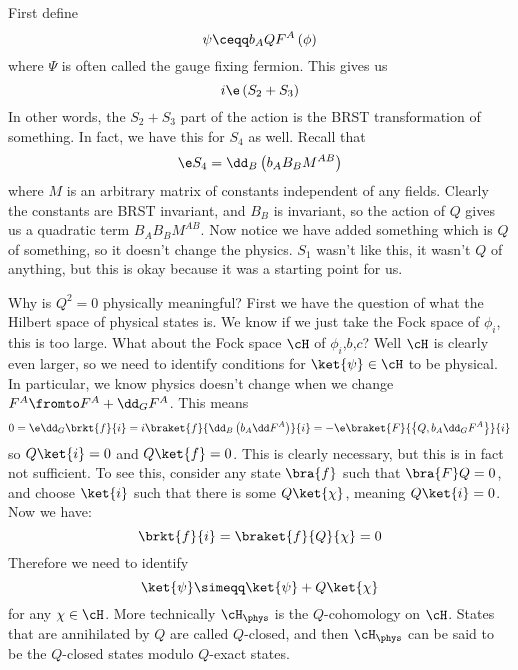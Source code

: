 \documentclass{booc}
\begin{document}
First define
\begin{equation}
\psi \ceqq b_AQ F^A\left( \phi \right)
\end{equation}
where $\Psi$ is often called the gauge fixing fermion. 
This gives us
\begin{equation}
i\e \left( S_2 + S_3 \right)
\end{equation}
In other words, the $S_2 + S_3$ part of the action is the BRST transformation of something.
In fact, we have this for $S_4$ as well. Recall that
\begin{equation}
\e S_4 = \dd_B\left( b_A B_B M^{AB} \right)
\end{equation}
where $M$ is an arbitrary matrix of constants independent of any fields. 
Clearly the constants are BRST invariant, and $B_B$ is invariant, so
the action of $Q$ gives us a quadratic term $B_A B_B M^{AB}$.
Now notice we have added something which is $Q$ of something, so it doesn't
change the physics. 
$S_1$ wasn't like this, it wasn't $Q$ of anything, but this is okay
because it was a starting point for us. 

Why is $Q^2 = 0$ physically meaningful?
First we have the question of what the Hilbert space of
physical states is. 
We know if we just take the Fock space of $\phi_i$, this is too large.
What about the Fock space $\cH$ of $\phi_i$,$b$,$c$?
Well $\cH$ is clearly even larger, so we need to identify conditions for 
$\ket{\psi}\in \cH$ to be physical. 
In particular, we know physics doesn't change
when we change $F^A \fromto F^A + \dd_G F^A$.
This means
\begin{equation}
0 = \e \dd_G \brkt{f}{i} 
= i \braket{f}{\dd_B\left( b_A \dd F^A \right)}{i} 
= -\e \braket{F}{ \left\{ Q , b_A \dd_G F^A \right\}}{i}
\end{equation}
so $Q\ket{i}= 0$ and $Q\ket{f} = 0$.
This is clearly necessary, but this is in fact not sufficient. 
To see this, consider any state $\bra{f}$ such that $\bra{F}Q = 0$, 
and choose $\ket{i}$ such that
there is some $Q\ket{\chi}$, meaning $Q\ket{i}=0$.
Now we have:
\begin{equation}
\brkt{f}{i} = \braket{f}{Q}{\chi} = 0
\end{equation}
Therefore we need to identify 
\begin{equation}
\ket{\psi} \simeqq \ket{\psi} + Q \ket{\chi}
\end{equation}
for any $\chi\in \cH$.
More technically $\cH_{\phys}$ is the $Q$-cohomology on $\cH$.
States that are annihilated by $Q$ are called $Q$-closed,
and then $\cH_\phys$ can be said to be the $Q$-closed states modulo
$Q$-exact states.
\end{document}
